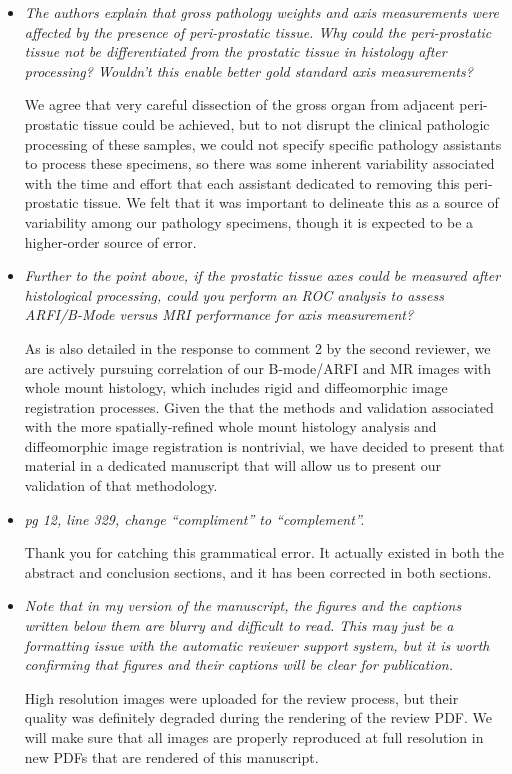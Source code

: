 \documentclass[10pt]{article}
\begin{document}
\begin{itemize}
    

    \item \textit{The authors explain that gross pathology weights and axis
            measurements were affected by the presence of peri-prostatic
            tissue.  Why could the peri-prostatic tissue not be differentiated
            from the prostatic tissue in histology after processing?  Wouldn't
            this enable better gold standard axis measurements?}

    We agree that very careful dissection of the gross organ from adjacent
    peri-prostatic tissue could be achieved, but to not disrupt the clinical
    pathologic processing of these samples, we could not specify specific
    pathology assistants to process these specimens, so there was some
    inherent variability associated with the time and effort that each
    assistant dedicated to removing this peri-prostatic tissue.  We felt that
    it was important to delineate this as a source of variability among our
    pathology specimens, though it is expected to be a higher-order source of
    error.

    \item \textit{Further to the point above, if the prostatic tissue axes
            could be measured after histological processing, could you perform
            an ROC analysis to assess ARFI/B-Mode versus MRI performance for
            axis measurement?}

    As is also detailed in the response to comment 2 by the second reviewer, we
    are actively pursuing correlation of our B-mode/ARFI and MR images with
    whole mount histology, which includes rigid and diffeomorphic image
    registration processes.  Given the that the methods and validation
    associated with the more spatially-refined whole mount histology analysis
    and diffeomorphic image registration is nontrivial, we have decided to
    present that material in a dedicated manuscript that will allow us to
    present our validation of that methodology.

    \item \textit{pg 12, line 329, change ``compliment'' to ``complement''.}

    Thank you for catching this grammatical error.  It actually existed in both
    the abstract and conclusion sections, and it has been corrected in both
    sections.

    \item \textit{Note that in my version of the manuscript, the figures and
            the captions written below them are blurry and difficult to read.
            This may just be a formatting issue with the automatic reviewer
            support system, but it is worth confirming that figures and their
            captions will be clear for publication.}

    High resolution images were uploaded for the review process, but their
    quality was definitely degraded during the rendering of the review PDF.  We
    will make sure that all images are properly reproduced at full resolution
    in new PDFs that are rendered of this manuscript.

\end{itemize}
\end{document}
